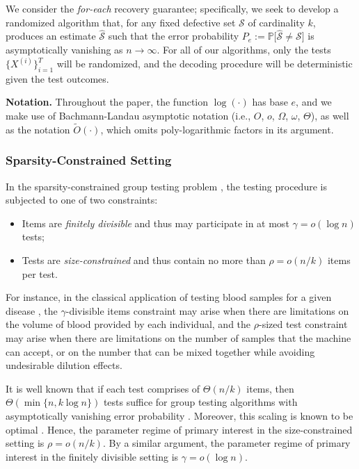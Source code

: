 We consider the \textit{for-each} recovery guarantee; specifically, we seek to develop a randomized algorithm that, for any fixed defective set $\mathcal{S}$ of cardinality $k$, produces an estimate $\widehat{\mathcal{S}}$ such that the error probability $P_e:=\mathbb{P}\big[\widehat{\mathcal{S}}\neq\mathcal{S}\big]$ is asymptotically vanishing as $n \to \infty$. For all of our algorithms, only the tests $\big\{X^{(i)}\big\}_{i=1}^T$ will be randomized, and the decoding procedure will be deterministic given the test outcomes.

\textbf{Notation.} Throughout the paper, the function $\log(\cdot)$ has base $e$, and we make use of Bachmann-Landau asymptotic
notation (i.e., $O$, $o$, $\Omega$, $\omega$, $\Theta$), as well as the notation $\widetilde{O}(\cdot)$, which omits poly-logarithmic factors in its argument.

\subsubsection{Sparsity-Constrained Setting}

In the sparsity-constrained group testing problem \cite{Ven19}, the testing procedure is subjected to one of two constraints:
\begin{itemize}
    \item Items are \textit{finitely divisible} and thus may participate in at most $\gamma=o(\log n)$ tests;
    \item Tests are \textit{size-constrained} and thus contain no more than $\rho=o(n/k)$ items per test.
\end{itemize}
For instance, in the classical application of testing blood samples for a given disease \cite{Dor43}, the $\gamma$-divisible items constraint may arise when there are limitations on the volume of blood provided by each individual, and the $\rho$-sized test constraint may arise when there are limitations on the number of samples that the machine can accept, or on the number that can be mixed together while avoiding undesirable dilution effects.

It is well known that if each test comprises of $\Theta(n/k)$ items, then $\Theta(\min\{n,k\log n\})$ tests suffice for group testing algorithms with asymptotically vanishing error probability \cite{Cha14,Ald14a,Sca15b,Joh16}.  Moreover, this scaling is known to be optimal \cite{Bay20}.  Hence, the parameter regime of primary interest in the size-constrained setting is $\rho=o(n/k)$. By a similar argument, the parameter regime of primary interest in the finitely divisible setting is $\gamma=o(\log n)$.  

